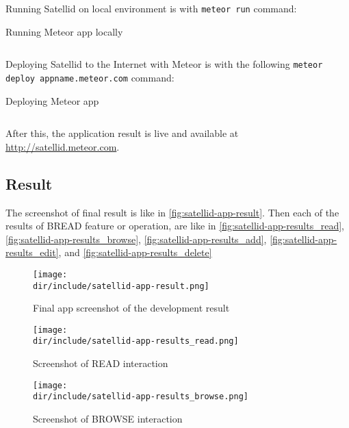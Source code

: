 Running Satellid on local environment is with \verb|meteor run| command:

\begin{listing}[h]
\caption{Running Meteor app locally}
\inputminted{shell-session}{\dir/include/satellid-meteor-run.shell-session}
\label{lst:satellid-run}
\end{listing}

Deploying Satellid to the Internet with Meteor is with the following \verb|meteor deploy appname.meteor.com| command:

\begin{listing}[h]
\caption{Deploying Meteor app}
\inputminted{shell-session}{\dir/include/satellid-meteor-deploy.shell-session}
\label{lst:satellid-deploy}
\end{listing}

After this, the application result is live and available at \url{http://satellid.meteor.com}.

\subsection{Result}

The screenshot of final result is like in \autoref{fig:satellid-app-result}.
Then each of the results of \ac{BREAD} feature or operation, are like in
\autoref{fig:satellid-app-results_read},
\autoref{fig:satellid-app-results_browse},
\autoref{fig:satellid-app-results_add},
\autoref{fig:satellid-app-results_edit}, and
\autoref{fig:satellid-app-results_delete}

\begin{figure}[!htp]
  \centering
  \texttt{[image: \\dir/include/satellid-app-result.png]}
  \caption{Final app screenshot of the development result}
  \label{fig:satellid-app-result}
\end{figure}

\begin{figure}[!htp]
  \centering
  \texttt{[image: \\dir/include/satellid-app-results\_read.png]}
  \caption{Screenshot of READ interaction}
  \label{fig:satellid-app-results_read}
\end{figure}

\begin{figure}[!htp]
  \centering
  \texttt{[image: \\dir/include/satellid-app-results\_browse.png]}
  \caption{Screenshot of BROWSE interaction}
  \label{fig:satellid-app-results_browse}
\end{figure}

